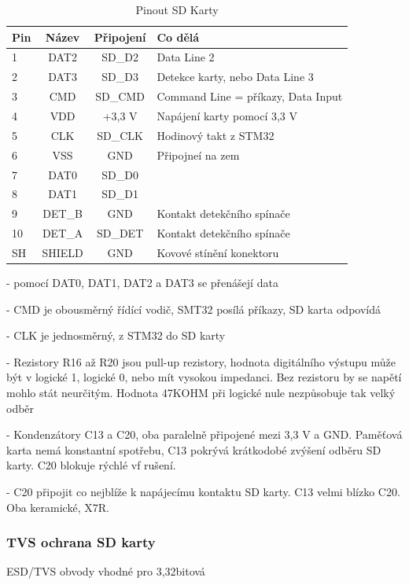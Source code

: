 \documentclass[12pt, a4paper]{article}
\begin{document}
\begin{table}[ht]
    \centering
    \caption{Pinout SD Karty}
    \label{tab:sd_karta_pinout}
    \begin{tabular}{lccp{7cm}}
        \toprule
        \textbf{Pin} & \textbf{Název} & \textbf{Připojení} & \textbf{Co dělá}\\
        \midrule
        1 & DAT2 & SD\_D2 & Data Line 2\\
        2 & DAT3 & SD\_D3 & Detekce karty, nebo Data Line 3 \\
        3 & CMD & SD\_CMD & Command Line = příkazy, Data Input\\
        4 & VDD & +3,3 V & Napájení karty pomocí 3,3 V\\
        5 & CLK & SD\_CLK & Hodinový takt z STM32\\
        6 & VSS & GND & Připojneí na zem\\
        7 & DAT0 & SD\_D0 & \\
        8 & DAT1 & SD\_D1 & \\
        9 & DET\_B & GND & Kontakt detekčního spínače\\
        10 & DET\_A & SD\_DET & Kontakt detekčního spínače\\
        SH & SHIELD & GND & Kovové stínění konektoru\\
       \bottomrule
    \end{tabular}
\end{table}


- pomocí DAT0, DAT1, DAT2 a DAT3 se přenášejí data

- CMD je obousměrný řídící vodič, SMT32 posílá příkazy, SD karta odpovídá

- CLK je jednosměrný, z STM32 do SD karty

- Rezistory R16 až R20 jsou pull-up rezistory, hodnota digitálního výstupu může být v logické 1, logické 0, nebo mít vysokou impedanci. Bez rezistoru by se napětí mohlo stát neurčitým. Hodnota 47KOHM při logické nule nezpůsobuje tak velký odběr

- Kondenzátory C13 a C20, oba paralelně připojené mezi 3,3 V a GND. Paměťová karta nemá konstantní spotřebu, C13 pokrývá krátkodobé zvýšení odběru SD karty. C20 blokuje rýchlé vf rušení.

- C20 připojit co nejblíže k napájecímu kontaktu SD karty. C13 velmi blízko C20. Oba keramické, X7R.


\subsubsection{TVS ochrana SD karty}
ESD/TVS obvody vhodné pro 3,32bitová
\end{document}
